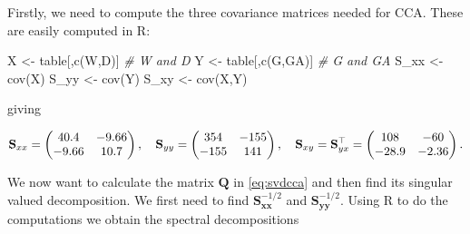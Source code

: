 \documentclass[
]{book}
\newenvironment{Shaded}{\begin{snugshade}}{\end{snugshade}}
\newcommand{\CommentTok}[1]{\textcolor[rgb]{0.56,0.35,0.01}{\textit{#1}}}
\newcommand{\DecValTok}[1]{\textcolor[rgb]{0.00,0.00,0.81}{#1}}
\newcommand{\FunctionTok}[1]{\textcolor[rgb]{0.00,0.00,0.00}{#1}}
\newcommand{\NormalTok}[1]{#1}
\newcommand{\OtherTok}[1]{\textcolor[rgb]{0.56,0.35,0.01}{#1}}
\newcommand{\SpecialCharTok}[1]{\textcolor[rgb]{0.00,0.00,0.00}{#1}}
\newcommand{\StringTok}[1]{\textcolor[rgb]{0.31,0.60,0.02}{#1}}
\theoremstyle{definition}
\theoremstyle{definition}
\theoremstyle{definition}
\theoremstyle{definition}
\theoremstyle{remark}
\begin{document}
Firstly, we need to compute the three covariance matrices needed for CCA. These are easily computed in R:

\begin{Shaded}
\begin{Highlighting}[]
\NormalTok{X }\OtherTok{\textless{}{-}}\NormalTok{ table[,}\FunctionTok{c}\NormalTok{(}\StringTok{\textquotesingle{}W\textquotesingle{}}\NormalTok{,}\StringTok{\textquotesingle{}D\textquotesingle{}}\NormalTok{)] }\CommentTok{\# W and D}
\NormalTok{Y }\OtherTok{\textless{}{-}}\NormalTok{ table[,}\FunctionTok{c}\NormalTok{(}\StringTok{\textquotesingle{}G\textquotesingle{}}\NormalTok{,}\StringTok{\textquotesingle{}GA\textquotesingle{}}\NormalTok{)] }\CommentTok{\# G and GA}
\NormalTok{S\_xx }\OtherTok{\textless{}{-}} \FunctionTok{cov}\NormalTok{(X)}
\NormalTok{S\_yy }\OtherTok{\textless{}{-}} \FunctionTok{cov}\NormalTok{(Y)}
\NormalTok{S\_xy }\OtherTok{\textless{}{-}} \FunctionTok{cov}\NormalTok{(X,Y)}
\end{Highlighting}
\end{Shaded}

giving

\[\mathbf S_{xx} =\begin{pmatrix}40.4&-9.66 \\-9.66&10.7 \\\end{pmatrix}, \quad \mathbf S_{yy} =\begin{pmatrix}354&-155 \\-155&141 \\\end{pmatrix}, \\
\quad \mathbf S_{xy}=\mathbf S_{yx}^\top =\begin{pmatrix}108&-60 \\-28.9&-2.36 \\\end{pmatrix}.\]

We now want to calculate the matrix \(\mathbf Q\) in \eqref{eq:svdcca} and then find its singular valued decomposition. We first need to find \(\mathbf S_{\mathbf x\mathbf x}^{-1/2}\) and \(\mathbf S_{\mathbf y\mathbf y}^{-1/2}\). Using R to do the computations we obtain the spectral decompositions

\begin{Shaded}
\end{Shaded}
\end{document}
